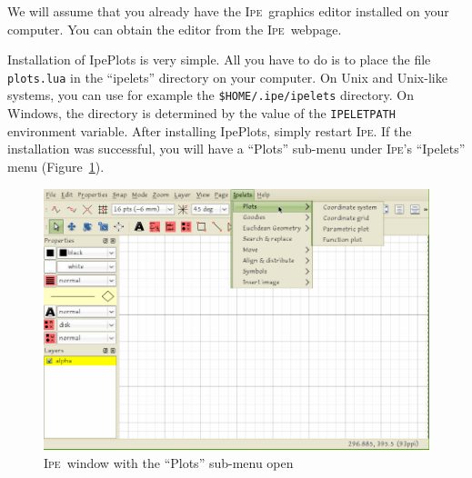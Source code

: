 \documentclass{article}
\def\Ipe{\textsc{Ipe}}
\begin{document}
We will assume that you already have the \Ipe\ graphics editor installed on
your computer.  You can obtain the editor from the \Ipe\ webpage\cite{ipeweb}. 

Installation of IpePlots is very simple.  All you have to do is to place the
file \texttt{plots.lua} in the ``ipelets'' directory on your computer.  On Unix
and Unix-like systems, you can use for example the \verb|$HOME/.ipe/ipelets|
directory.  On Windows, the directory is determined by the value of the
\texttt{IPELETPATH} environment variable.  After installing IpePlots, simply
restart \Ipe.  If the installation was successful, you will have a ``Plots''
sub-menu under \Ipe's ``Ipelets'' menu (Figure~\ref{fig:ipewindow}).
\begin{figure}[h]
   \begin{center}
      \includegraphics[scale=3]{ipewindow.png}
   \end{center}
   \caption{\Ipe\ window with the ``Plots'' sub-menu open}
   \label{fig:ipewindow}
\end{figure}
\end{document}
